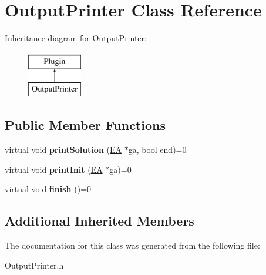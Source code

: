 \hypertarget{classOutputPrinter}{}\section{Output\+Printer Class Reference}
\label{classOutputPrinter}
Inheritance diagram for Output\+Printer\+:\begin{figure}[H]
\begin{center}
\leavevmode
\includegraphics[height=2.000000cm]{dd/d6f/classOutputPrinter}
\end{center}
\end{figure}
\subsection*{Public Member Functions}
\begin{DoxyCompactItemize}
\item 
\mbox{\label{classOutputPrinter_ae7e777123d103ccd0e8ad77a511aaaab}} 
virtual void {\bfseries print\+Solution} (\mbox{\hyperlink{classEA}{EA}} $\ast$ga, bool end)=0
\item 
\mbox{\label{classOutputPrinter_a86e3c9a97a5ad0eb71c8701f7c8a622f}} 
virtual void {\bfseries print\+Init} (\mbox{\hyperlink{classEA}{EA}} $\ast$ga)=0
\item 
\mbox{\label{classOutputPrinter_a6902ce594bdec28859a84afb4f448112}} 
virtual void {\bfseries finish} ()=0
\end{DoxyCompactItemize}
\subsection*{Additional Inherited Members}


The documentation for this class was generated from the following file\+:\begin{DoxyCompactItemize}
\item 
Output\+Printer.\+h\end{DoxyCompactItemize}
